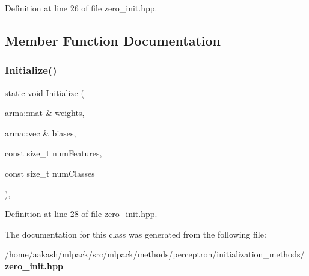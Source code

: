 Definition at line 26 of file zero\+\_\+init.\+hpp.



\subsection{Member Function Documentation}
\mbox{\label{classmlpack_1_1perceptron_1_1ZeroInitialization_ae4285f008adf2a80d33e3fa1570d86d5}} 
\subsubsection{Initialize()}
{\footnotesize\ttfamily static void Initialize (\begin{DoxyParamCaption}\item[{arma\+::mat \&}]{weights,  }\item[{arma\+::vec \&}]{biases,  }\item[{const size\+\_\+t}]{num\+Features,  }\item[{const size\+\_\+t}]{num\+Classes }\end{DoxyParamCaption})\hspace{0.3cm}{\ttfamily [inline]}, {\ttfamily [static]}}



Definition at line 28 of file zero\+\_\+init.\+hpp.



The documentation for this class was generated from the following file\+:\begin{DoxyCompactItemize}
\item 
/home/aakash/mlpack/src/mlpack/methods/perceptron/initialization\+\_\+methods/\textbf{ zero\+\_\+init.\+hpp}\end{DoxyCompactItemize}

